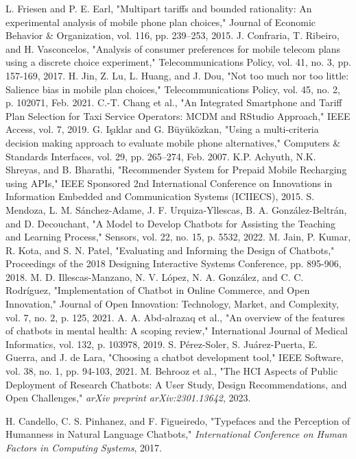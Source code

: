 \documentclass[conference]{IEEEtran}
\begin{document}
\begin{thebibliography}{00}
 L. Friesen and P. E. Earl, "Multipart tariffs and bounded rationality: An experimental analysis of mobile phone plan choices," Journal of Economic Behavior \& Organization, vol. 116, pp. 239–253, 2015.
 J. Confraria, T. Ribeiro, and H. Vasconcelos, "Analysis of consumer preferences for mobile telecom plans using a discrete choice experiment," Telecommunications Policy, vol. 41, no. 3, pp. 157-169, 2017.
 H. Jin, Z. Lu, L. Huang, and J. Dou, "Not too much nor too little: Salience bias in mobile plan choices," Telecommunications Policy, vol. 45, no. 2, p. 102071, Feb. 2021.
 C.-T. Chang et al., "An Integrated Smartphone and Tariff Plan Selection for Taxi Service Operators: MCDM and RStudio Approach," IEEE Access, vol. 7, 2019.
 G. Işıklar and G. Büyüközkan, "Using a multi-criteria decision making approach to evaluate mobile phone alternatives," Computers \& Standards Interfaces, vol. 29, pp. 265–274, Feb. 2007.
 K.P. Achyuth, N.K. Shreyas, and B. Bharathi, "Recommender System for Prepaid Mobile Recharging using APIs," IEEE Sponsored 2nd International Conference on Innovations in Information Embedded and Communication Systems (ICIIECS), 2015.
 S. Mendoza, L. M. Sánchez-Adame, J. F. Urquiza-Yllescas, B. A. González-Beltrán, and D. Decouchant, "A Model to Develop Chatbots for Assisting the Teaching and Learning Process," Sensors, vol. 22, no. 15, p. 5532, 2022.
 M. Jain, P. Kumar, R. Kota, and S. N. Patel, "Evaluating and Informing the Design of Chatbots," Proceedings of the 2018 Designing Interactive Systems Conference, pp. 895-906, 2018.
 M. D. Illescas-Manzano, N. V. López, N. A. González, and C. C. Rodríguez, "Implementation of Chatbot in Online Commerce, and Open Innovation," Journal of Open Innovation: Technology, Market, and Complexity, vol. 7, no. 2, p. 125, 2021.
 A. A. Abd-alrazaq et al., "An overview of the features of chatbots in mental health: A scoping review," International Journal of Medical Informatics, vol. 132, p. 103978, 2019.
 S. Pérez-Soler, S. Juárez-Puerta, E. Guerra, and J. de Lara, "Choosing a chatbot development tool," IEEE Software, vol. 38, no. 1, pp. 94-103, 2021.
 M. Behrooz et al., "The HCI Aspects of Public Deployment of Research Chatbots: A User Study, Design Recommendations, and Open Challenges," \textit{arXiv preprint arXiv:2301.13642}, 2023.

 H. Candello, C. S. Pinhanez, and F. Figueiredo, "Typefaces and the Perception of Humanness in Natural Language Chatbots," \textit{International Conference on Human Factors in Computing Systems}, 2017.


\end{thebibliography}
\end{document}
